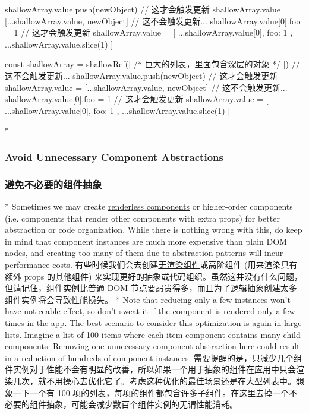 \begin{paracol}{2}
\begin{codeJs}
shallowArray.value.push(newObject)
// 这才会触发更新
shallowArray.value = [...shallowArray.value, newObject]
// 这不会触发更新...
shallowArray.value[0].foo = 1
// 这才会触发更新
shallowArray.value = [
  {
    ...shallowArray.value[0],
    foo: 1
  },
  ...shallowArray.value.slice(1)
]
\end{codeJs}
\switchcolumn
\begin{codeJs}
const shallowArray = shallowRef([
  /* 巨大的列表，里面包含深层的对象 */
])
// 这不会触发更新...
shallowArray.value.push(newObject)
// 这才会触发更新
shallowArray.value = [...shallowArray.value, newObject]
// 这不会触发更新...
shallowArray.value[0].foo = 1
// 这才会触发更新
shallowArray.value = [
  {
    ...shallowArray.value[0],
    foo: 1
  },
  ...shallowArray.value.slice(1)
]
\end{codeJs}
\switchcolumn[0]*%
\subsubsection{Avoid Unnecessary Component Abstractions}
\switchcolumn
\subsubsection{避免不必要的组件抽象}
\switchcolumn[0]*%
Sometimes we may create
\href{https://vuejs.org/guide/components/slots.html\#renderless-components}{renderless
components} or higher-order components (i.e. components that render
other components with extra props) for better abstraction or code
organization. While there is nothing wrong with this, do keep in mind
that component instances are much more expensive than plain DOM nodes,
and creating too many of them due to abstraction patterns will incur
performance costs.
\switchcolumn
有些时候我们会去创建\href{https://cn.vuejs.org/guide/components/slots.html\#renderless-components}{无渲染组件}或高阶组件
(用来渲染具有额外 props 的其他组件)
来实现更好的抽象或代码组织。虽然这并没有什么问题，但请记住，组件实例比普通
DOM 节点要昂贵得多，而且为了逻辑抽象创建太多组件实例将会导致性能损失。
\switchcolumn[0]*%
Note that reducing only a few instances won't have noticeable effect, so
don't sweat it if the component is rendered only a few times in the app.
The best scenario to consider this optimization is again in large lists.
Imagine a list of 100 items where each item component contains many
child components. Removing one unnecessary component abstraction here
could result in a reduction of hundreds of component instances.
\switchcolumn
需要提醒的是，只减少几个组件实例对于性能不会有明显的改善，所以如果一个用于抽象的组件在应用中只会渲染几次，就不用操心去优化它了。考虑这种优化的最佳场景还是在大型列表中。想象一下一个有
100
项的列表，每项的组件都包含许多子组件。在这里去掉一个不必要的组件抽象，可能会减少数百个组件实例的无谓性能消耗。
\end{paracol}


